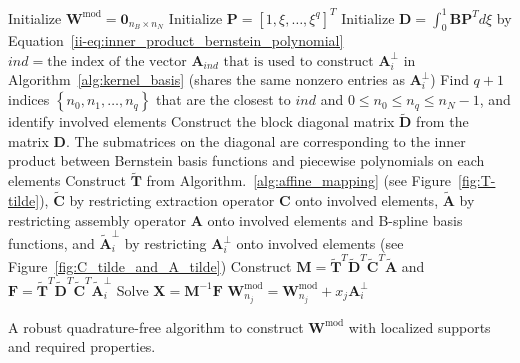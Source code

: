 \begin{algorithm}[H]\label{alg:modification_weight_new}

	\BlankLine
	Initialize $\mathbf{W}^\text{mod}=\mathbf{0}_{n_B \times n_N }$\;
	Initialize $\mathbf{P}=\left[{1, \xi,\dots,\xi^q}\right]^T$\;
	Initialize $\mathbf{D}=\int_0^1 \mathbf{B} \mathbf{P}^T d\xi$ by Equation~\eqref{ii-eq:inner_product_bernstein_polynomial}\;
	{
	$ind =\text{the index of the vector $\mathbf{A}_{ind}$ that is used to construct $\mathbf{A}^\perp_i$}$ in Algorithm~\ref{alg:kernel_basis} (shares the same nonzero entries as $\mathbf{A}^\perp_i$)\;
	Find $q+1$ indices $\left\{{n_0,n_1,\dots,n_{q}}\right\}$ that are the closest to $ind$ and $0\leq{}n_0\leq{}n_q\leq{}n_N-1$, and identify involved elements\;
	Construct the block diagonal matrix $\tilde{\mathbf{D}}$ from the matrix $\mathbf{D}$. The submatrices on the diagonal are corresponding to the inner product between Bernstein basis functions and piecewise polynomials on each elements \;
	Construct $\tilde{\mathbf{T}}$ from Algorithm.~\ref{alg:affine_mapping} (see Figure~\ref{fig:T-tilde}), $\tilde{\mathbf{C}}$ by restricting extraction operator $\mathbf{C}$ onto involved elements, $\tilde{\mathbf{A}}$ by restricting assembly operator $\mathbf{A}$ onto involved elements and B-spline basis functions, and $\tilde{\mathbf{A}}^\perp_i$ by restricting ${\mathbf{A}}^\perp_i$ onto involved elements (see Figure~\ref{fig:C_tilde_and_A_tilde})\;
	Construct $\mathbf{M}=\tilde{\mathbf{T}}^T \tilde{\mathbf{D}}^T \tilde{\mathbf{C}}^T \tilde{\mathbf{A}}$ and $\mathbf{F}=\tilde{\mathbf{T}}^T \tilde{\mathbf{D}}^T \tilde{\mathbf{C}}^T \tilde{\mathbf{A}}^\perp_i$\;
	Solve $\mathbf{X}=\mathbf{M}^{-1}\mathbf{F}$\;
	{
		$\mathbf{W}^\text{mod}_{n_j}=\mathbf{W}^\text{mod}_{n_j}+x_j\mathbf{A}^\perp_i$\;
	}
	}
	\caption{A robust quadrature-free algorithm to construct $\mathbf{W}^\text{mod}$ with localized supports and required properties.}
\end{algorithm}

